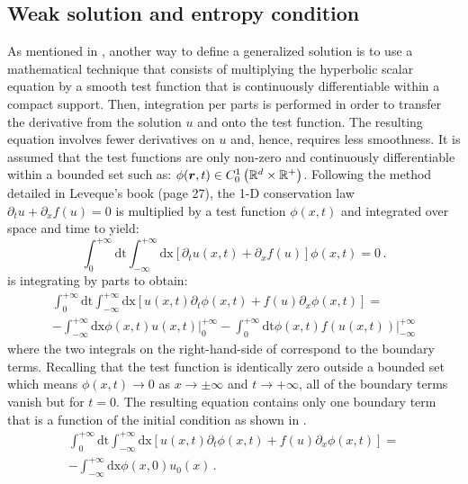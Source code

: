 \subsection{Weak solution and entropy condition}\label{weak_sct1b}
%
As mentioned in , another way to define a generalized solution is to use a mathematical technique that consists of multiplying the hyperbolic scalar equation by a smooth test function that is continuously differentiable within a compact support. Then, integration per parts is performed in order to transfer the derivative from the solution $u$ and onto the test function. The resulting equation involves fewer derivatives on $u$ and, hence, requires less smoothness. It is assumed that the test functions are only non-zero and continuously differentiable within a bounded set such as: $\phi(\boldsymbol r,t) \in C_0^1 \left( \mathbb{R}^d \times \mathbb{R^+} \right)$. 
Following the method detailed in Leveque's book \cite{Leveque} (page 27), the 1-D conservation law $\partial_t u + \partial_x f(u) = 0$ is multiplied by a test function $\phi(x,t)$ and integrated over space and time to yield:
%
\begin{equation}\label{eq:weak_sol_sct1b}
\int_0^{+\infty}\text{dt}\int_{-\infty}^{+\infty}\text{dx} \left[ \partial_t u(x,t) + \partial_x f(u) \right] \phi(x,t) = 0 \,.
\end{equation}
% 
 is integrating by parts to obtain:
%
\begin{eqnarray}\label{eq:weak_sol2_sct1b}
\int_0^{+\infty}\text{dt}\int_{-\infty}^{+\infty}\text{dx} \left[ u(x,t) \partial_t \phi(x,t)   + f(u) \partial_x \phi(x,t)  \right] = \nonumber \\
-\int_{-\infty}^{+\infty}\text{dx} \phi(x,t) u(x,t) \left. \right|_0^{+\infty} - \int_0^{+\infty}\text{dt} \phi(x,t) f(u(x,t)) \left. \right|_{-\infty}^{+\infty}
\end{eqnarray}
%
where the two integrals on the right-hand-side of  correspond to the boundary terms. Recalling that the test function is identically zero outside a bounded set which means $\phi(x,t) \to 0$ as $x \to \pm  \infty$ and $t \to +\infty$, all of the boundary terms vanish but for $t=0$. The resulting equation contains only one boundary term that is a function of the initial condition as shown in .
%
\begin{eqnarray}\label{eq:weak_sol3_sct1b}
\int_0^{+\infty}\text{dt}\int_{-\infty}^{+\infty}\text{dx} \left[ u(x,t) \partial_t \phi(x,t)   + f(u) \partial_x \phi(x,t)  \right] = \nonumber \\
-\int_{-\infty}^{+\infty}\text{dx} \phi(x,0) u_0(x) \,.
\end{eqnarray}
